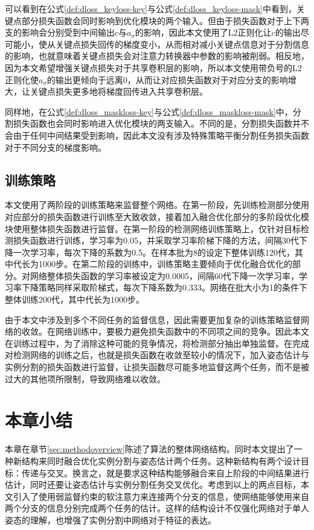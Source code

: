 可以看到在公式\eqref{def:dloss_keyloss-key}与公式\eqref{def:dloss_keyloss-mask}中看到，关键点部分损失函数会同时影响到优化模块的两个输入。但由于损失函数对于上下两支的影响会分别受到中间输出$c$与$a_{\sigma}$的影响，因此本文使用了L2正则化让$c$的输出尽可能小，使从关键点损失回传的梯度变小，从而相对减小关键点信息对于分割信息的影响，也就意味着关键点损失会对注意力转换器中参数的影响被削弱。相反地，因为本文希望增强关键点损失对于共享卷积层的影响，所以本文使用带负号的L2正则化使$a_{\sigma}$的输出更倾向于远离0，从而让对应损失函数对于对应分支的影响增大，让关键点损失更多地将梯度回传进入共享卷积层。

同样地，在公式\eqref{def:dloss_maskloss-key}与公式\eqref{def:dloss_maskloss-mask}中，分割损失函数也会同时影响进入优化模块的两支输入。不同的是，分割损失函数并不会由于任何中间结果受到影响，因此本文没有涉及特殊策略平衡分割任务损失函数对于不同分支的梯度影响。


\subsection{训练策略}
\label{subsec:trainingstrategy}

本文使用了两阶段的训练策略来监督整个网络。在第一阶段，先训练检测部分使用对应部分的损失函数进行训练至大致收敛，接着加入融合优化部分的多阶段优化模块使用整体损失函数进行监督。在第一阶段的检测网络训练策略上，仅针对目标检测损失函数进行训练，学习率为0.05，并采取学习率阶梯下降的方法，间隔30代下降一次学习率，每次下降的系数为0.5。在样本批为8的设定下整体训练120代，其中代长为1000步。在第二阶段的训练中，训练策略主要倾向于优化融合优化的部分。对网络整体损失函数的学习率被设定为0.0005，间隔60代下降一次学习率，学习率下降策略同样采取阶梯式，每次下降系数为0.333。网络在批大小为1的条件下整体训练200代，其中代长为1000步。

由于本文中涉及到多个不同任务的监督信息，因此需要更加复杂的训练策略监督网络的收敛。在网络训练中，要极力避免损失函数中的不同项之间的竞争。因此本文在训练过程中，为了消除这种可能的竞争情况，将检测部分抽出单独监督。在完成对检测网络的训练之后，也就是损失函数在收敛至较小的情况下，加入姿态估计与实例分割的损失函数进行监督，让损失函数尽可能多地监督这两个任务，而不是被过大的其他项所限制，导致网络难以收敛。

\section{本章小结}
本章在章节\ref{sec:methodoverview}陈述了算法的整体网络结构。同时本文提出了一种新结构来同时融合优化实例分割与姿态估计两个任务。这种新结构有两个设计目标：传递与交叉。换言之，就是要求这种结构能够融合来自上阶段的中间结果进行估计，同时还要让姿态估计与实例分割任务交叉优化。考虑到以上的两点目标，本文引入了使用弱监督约束的软注意力来连接两个分支的信息，使网络能够使用来自两个分支的信息分别完成两个任务的估计。这样的结构设计不仅强化网络对于单人姿态的理解，也增强了实例分割中网络对于特征的表达。